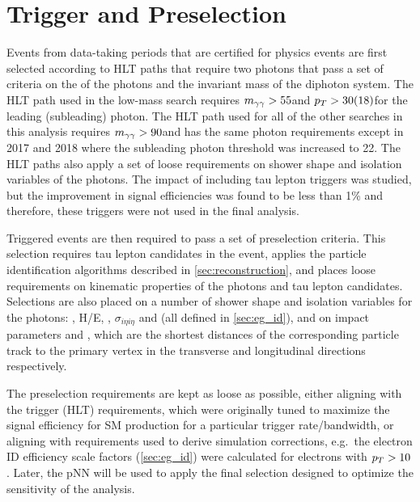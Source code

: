 \section{Trigger and Preselection}\label{sec:ggtt_trigger_preselection}

Events from data-taking periods that are certified for physics events are first selected according to HLT paths that require two photons that pass a set of criteria on the \pt of the photons and the invariant mass of the diphoton system. The HLT path used in the low-mass \XYggHtt search requires $m_{\gamma\gamma} > 55$\GeV and $p_T > 30 (18)$\GeV for the leading (subleading) photon. The HLT path used for all of the other searches in this analysis requires $m_{\gamma\gamma} > 90$\GeV and has the same photon \pt requirements except in 2017 and 2018 where the subleading photon threshold was increased to 22\GeV. The HLT paths also apply a set of loose requirements on shower shape and isolation variables of the photons. The impact of including tau lepton triggers was studied, but the improvement in signal efficiencies was found to be less than 1\% and therefore, these triggers were not used in the final analysis.

Triggered events are then required to pass a set of preselection criteria. This selection requires tau lepton candidates in the event, applies the particle identification algorithms described in \cref{sec:reconstruction}, and places loose requirements on kinematic properties of the photons and tau lepton candidates. Selections are also placed on a number of shower shape and isolation variables for the photons: \Ich, H/E, \RNINE, $\sigma_{i\eta i\eta}$ and \Iph (all defined in \cref{sec:eg_id}), and on impact parameters \dxy and \dz, which are the shortest distances of the corresponding particle track to the primary vertex in the transverse and longitudinal directions respectively.

The preselection requirements are kept as loose as possible, either aligning with the trigger (HLT) requirements, which were originally tuned to maximize the signal efficiency for SM \PH production for a particular trigger rate/bandwidth, or aligning with requirements used to derive simulation corrections, e.g.\ the electron ID efficiency scale factors (\cref{sec:eg_id}) were calculated for electrons with $p_T>10$\GeV. Later, the pNN will be used to apply the final selection designed to optimize the sensitivity of the analysis. 

